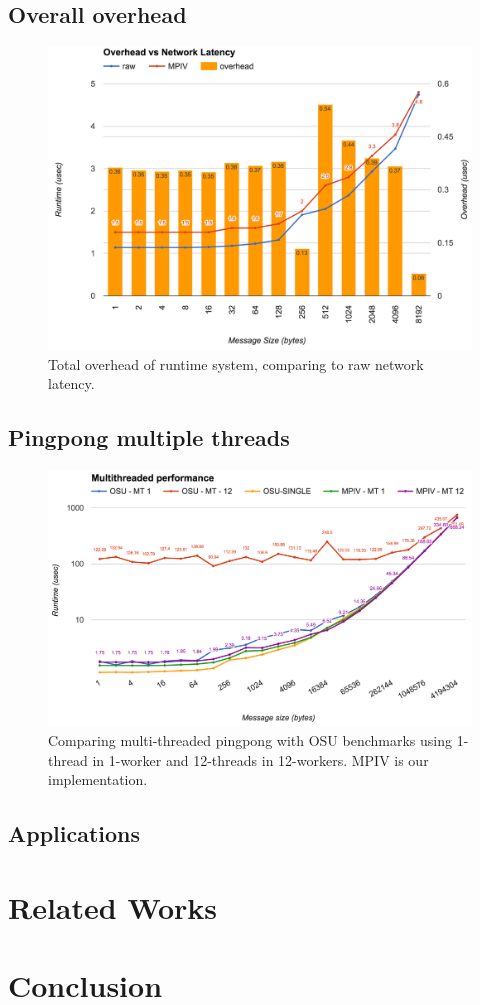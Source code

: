 \documentclass[11pt]{article}
\begin{document}
\newpage

\subsection{Overall overhead}
\begin{figure}[h!]
  \centering 
  \includegraphics[width=\textwidth]{fig/overhead.png}
  \caption{Total overhead of runtime system, comparing to raw network latency.}
\end{figure}

\subsection{Pingpong multiple threads}
\begin{figure}[h!]
  \centering 
  \includegraphics[width=\textwidth]{fig/pingpong.png}
  \caption{Comparing multi-threaded pingpong with OSU benchmarks using 1-thread
  in 1-worker and 12-threads in 12-workers. MPIV is our implementation.}
\end{figure}

\newpage

\subsection{Applications}
\section{Related Works}
\section{Conclusion}
\end{document}
